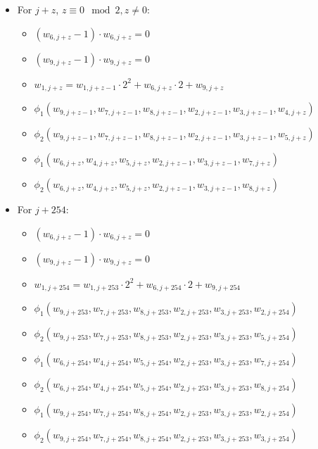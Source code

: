 \begin{itemize}
\begin{itemize}
        \end{itemize}
    \item For $j + z$, $z \equiv 0 \mod 2, z \neq 0$:
        \begin{itemize}
            \item $(w_{6, j + z} - 1) \cdot w_{6, j + z} = 0$
        	 \item $(w_{9, j + z} - 1) \cdot w_{9, j + z} = 0$
            \item $w_{1, j + z} = w_{1, j + z - 1} \cdot 2^2 + w_{6, j + z} \cdot 2 + w_{9, j + z}$
            \item $\phi_1(w_{9, j + z - 1}, w_{7, j + z - 1}, w_{8, j + z - 1}, w_{2, j + z - 1}, w_{3, j + z - 1}, w_{4, j + z})$
            \item $\phi_2(w_{9, j + z - 1}, w_{7, j + z - 1}, w_{8, j + z - 1}, w_{2, j + z - 1}, w_{3, j + z - 1}, w_{5, j + z})$
            \item $\phi_1(w_{6, j + z}, w_{4, j + z}, w_{5, j + z}, w_{2, j + z - 1}, w_{3, j + z - 1}, w_{7, j + z})$
            \item $\phi_2(w_{6, j + z}, w_{4, j + z}, w_{5, j + z}, w_{2, j + z - 1}, w_{3, j + z - 1}, w_{8, j + z})$         
        \end{itemize}
    \item For $j + 254$:
        \begin{itemize}
        	 \item $(w_{6, j + z} - 1) \cdot w_{6, j + z} = 0$
        	 \item $(w_{9, j + z} - 1) \cdot w_{9, j + z} = 0$
            \item $w_{1, j + 254} = w_{1, j + 253} \cdot 2^2 + w_{6, j + 254} \cdot 2 + w_{9, j + 254}$
            \item $\phi_1(w_{9, j + 253}, w_{7, j + 253}, w_{8, j + 253}, w_{2, j + 253}, w_{3, j + 253}, w_{2, j + 254})$
            \item $\phi_2(w_{9, j + 253}, w_{7, j + 253}, w_{8, j + 253}, w_{2, j + 253}, w_{3, j + 253}, w_{5, j + 254})$
            \item $\phi_1(w_{6, j + 254}, w_{4, j + 254}, w_{5, j + 254}, w_{2, j + 253}, w_{3, j + 253}, w_{7, j + 254})$
            \item $\phi_2(w_{6, j + 254}, w_{4, j + 254}, w_{5, j + 254}, w_{2, j + 253}, w_{3, j + 253}, w_{8, j + 254})$
            \item $\phi_1(w_{9, j + 254}, w_{7, j + 254}, w_{8, j + 254}, w_{2, j + 253}, w_{3, j + 253}, w_{2, j + 254})$
            \item $\phi_2(w_{9, j + 254}, w_{7, j + 254}, w_{8, j + 254}, w_{2, j + 253}, w_{3, j + 253}, w_{3, j + 254})$ 
        \end{itemize}

\end{itemize}
